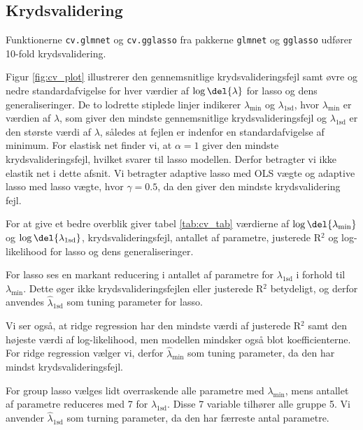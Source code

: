\subsection{Krydsvalidering}
Funktionerne \texttt{cv.glmnet} og \texttt{cv.gglasso} fra pakkerne \texttt{glmnet} og \texttt{gglasso} udfører 10-fold krydsvalidering.

Figur \ref{fig:cv_plot} illustrerer den gennemsnitlige krydsvalideringsfejl samt øvre og nedre standardafvigelse for hver værdier af $\log \del{\lambda}$ for lasso og dens generaliseringer. 
De to lodrette stiplede linjer indikerer \(\lambda_{\text{min}}\) og \(\lambda_\text{1sd}\), hvor \(\lambda_{\text{min}}\) er værdien af \(\lambda\), som giver den mindste gennemsnitlige krydsvalideringsfejl og \(\lambda_\text{1sd}\) er den største værdi af \(\lambda\), således at fejlen er indenfor en standardafvigelse af minimum. 
For elastisk net finder vi, at $\alpha =1$ giver den mindste krydsvalideringsfejl, hvilket svarer til lasso modellen. Derfor betragter vi ikke elastik net i dette afsnit. 
Vi betragter adaptive lasso med OLS vægte og adaptive lasso med lasso vægte, hvor $\gamma = 0.5$, da den giver den mindste krydsvalidering fejl. 

%



For at give et bedre overblik giver tabel \ref{tab:cv_tab} værdierne af $\log \del{ \lambda_{\min}}$ og $\log \del{ \lambda_{1\text{sd}}}$, krydsvalideringsfejl, antallet af parametre, justerede R$^2$ og log-likelihood for lasso og dens generaliseringer.

For lasso ses en markant reducering i antallet af parametre for $\lambda_{1\text{sd}}$ i forhold til $\lambda_{\min}$. Dette øger ikke krydsvalideringsfejlen eller justerede R$^2$ betydeligt, og derfor anvendes $\widehat{\lambda}_{1\text{sd}}$ som tuning parameter for lasso. 

Vi ser også, at ridge regression har den mindste værdi af justerede R$^2$ samt den højeste værdi af log-likelihood, men modellen mindsker også blot koefficienterne. 
For ridge regression vælger vi, derfor $\widehat{\lambda}_{\min}$ som tuning parameter, da den har mindst krydsvalideringsfejl.

For group lasso vælges lidt overraskende alle parametre med \(\lambda_\text{min}\), mens antallet af parametre reduceres med 7 for $\lambda_{1\text{sd}}$. 
Disse 7 variable tilhører alle gruppe 5.
Vi anvender $\widehat{\lambda}_{1\text{sd}}$ som turning parameter, da den har færreste antal parametre. 

